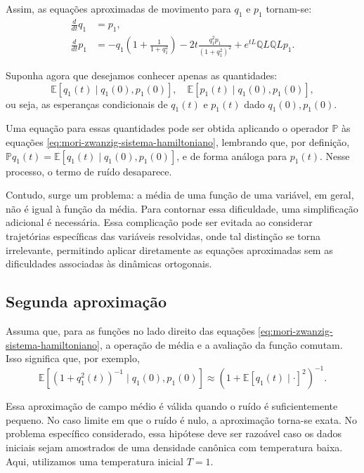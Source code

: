 \documentclass[12pt]{article}
\begin{document}
Assim, as equações aproximadas de movimento para $q_1$ e $p_1$ tornam-se:
\begin{align}
	\frac{d}{dt} q_1 & = p_1, \nonumber \\
	\frac{d}{dt} p_1 & = -q_1\left(1 + \frac{1}{1 + q_1^2}\right) - 2t\frac{q_1^2 p_1}{(1 + q_1^2)^2} + e^{tL} \mathbb{Q}L \mathbb{Q}L p_1. \label{eq:mori-zwanzig-sistema-hamiltoniano}
\end{align}

Suponha agora que desejamos conhecer apenas as quantidades:
\begin{equation*}
	\mathbb{E}[q_1(t) \mid q_1(0), p_1(0)], \quad \mathbb{E}[p_1(t) \mid q_1(0), p_1(0)],
\end{equation*}
ou seja, as esperanças condicionais de $q_1(t)$ e $p_1(t)$ dado $q_1(0), p_1(0)$. 

Uma equação para essas quantidades pode ser obtida aplicando o operador $\mathbb{P}$ às equações \eqref{eq:mori-zwanzig-sistema-hamiltoniano}, lembrando que, por definição, $\mathbb{P}q_1(t) = \mathbb{E}[q_1(t) \mid q_1(0), p_1(0)]$, e de forma análoga para $p_1(t)$. Nesse processo, o termo de ruído desaparece.

Contudo, surge um problema: a média de uma função de uma variável, em geral, não é igual à função da média. Para contornar essa dificuldade, uma simplificação adicional é necessária. Essa complicação pode ser evitada ao considerar trajetórias específicas das variáveis resolvidas, onde tal distinção se torna irrelevante, permitindo aplicar diretamente as equações aproximadas sem as dificuldades associadas às dinâmicas ortogonais.

\subsection{Segunda aproximação}

Assuma que, para as funções no lado direito das equações \eqref{eq:mori-zwanzig-sistema-hamiltoniano}, a operação de média e a avaliação da função comutam. Isso significa que, por exemplo,
\begin{equation*}
    \mathbb{E}[(1 + q_1^2(t))^{-1} \mid q_1(0), p_1(0)] \approx \left(1 + \mathbb{E}[q_1(t) \mid \cdot]^2\right)^{-1}.
\end{equation*}

Essa aproximação de campo médio é válida quando o ruído é suficientemente pequeno. No caso limite em que o ruído é nulo, a aproximação torna-se exata. No problema específico considerado, essa hipótese deve ser razoável caso os dados iniciais sejam amostrados de uma densidade canônica com temperatura baixa. Aqui, utilizamos uma temperatura inicial \(T = 1\).
\end{document}
